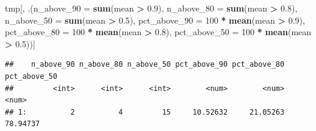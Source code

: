 \documentclass[
  11pt,
]{article}
\newenvironment{Shaded}{\begin{snugshade}}{\end{snugshade}}
\newcommand{\AttributeTok}[1]{\textcolor[rgb]{0.13,0.29,0.53}{#1}}
\newcommand{\CommentTok}[1]{\textcolor[rgb]{0.56,0.35,0.01}{\textit{#1}}}
\newcommand{\DecValTok}[1]{\textcolor[rgb]{0.00,0.00,0.81}{#1}}
\newcommand{\FloatTok}[1]{\textcolor[rgb]{0.00,0.00,0.81}{#1}}
\newcommand{\FunctionTok}[1]{\textcolor[rgb]{0.13,0.29,0.53}{\textbf{#1}}}
\newcommand{\NormalTok}[1]{#1}
\newcommand{\SpecialCharTok}[1]{\textcolor[rgb]{0.81,0.36,0.00}{\textbf{#1}}}
\begin{document}
\begin{Shaded}
\begin{Highlighting}[]
\NormalTok{tmp[, .(}\AttributeTok{n\_above\_90 =} \FunctionTok{sum}\NormalTok{(mean }\SpecialCharTok{\textgreater{}} \FloatTok{0.9}\NormalTok{),}
        \AttributeTok{n\_above\_80 =} \FunctionTok{sum}\NormalTok{(mean }\SpecialCharTok{\textgreater{}} \FloatTok{0.8}\NormalTok{),}
        \AttributeTok{n\_above\_50 =} \FunctionTok{sum}\NormalTok{(mean }\SpecialCharTok{\textgreater{}} \FloatTok{0.5}\NormalTok{),}
        \AttributeTok{pct\_above\_90 =} \DecValTok{100} \SpecialCharTok{*} \FunctionTok{mean}\NormalTok{(mean }\SpecialCharTok{\textgreater{}} \FloatTok{0.9}\NormalTok{),}
        \AttributeTok{pct\_above\_80 =} \DecValTok{100} \SpecialCharTok{*} \FunctionTok{mean}\NormalTok{(mean }\SpecialCharTok{\textgreater{}} \FloatTok{0.8}\NormalTok{),}
        \AttributeTok{pct\_above\_50 =} \DecValTok{100} \SpecialCharTok{*} \FunctionTok{mean}\NormalTok{(mean }\SpecialCharTok{\textgreater{}} \FloatTok{0.5}\NormalTok{))]}
\end{Highlighting}
\end{Shaded}

\begin{verbatim}
##    n_above_90 n_above_80 n_above_50 pct_above_90 pct_above_80 pct_above_50
##         <int>      <int>      <int>        <num>        <num>        <num>
## 1:          2          4         15     10.52632     21.05263     78.94737
\end{verbatim}

\begin{Shaded}
\end{Shaded}
\end{document}

